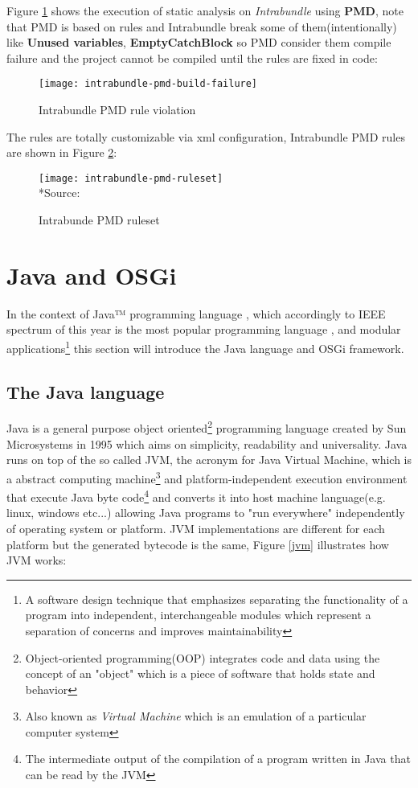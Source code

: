 \FloatBarrier

Figure \ref{pmd violation} shows the execution of static analysis on \textit{Intrabundle} using \textbf{PMD}, note that PMD is based on rules and Intrabundle break some of them(intentionally) like \textbf{Unused variables}, \textbf{EmptyCatchBlock} so PMD consider them compile failure and the project cannot be compiled until the rules are fixed in code:

\begin{figure}[h]
\label{pmd violation}
\caption{Intrabundle PMD rule violation}
\centering
\texttt{[image: intrabundle-pmd-build-failure]}
\end{figure}

\FloatBarrier

The rules are totally customizable via xml configuration, Intrabundle PMD rules are shown in Figure \ref{pmd ruleset}:

\begin{figure}[h]
\label{pmd ruleset}
\caption{Intrabunde PMD ruleset}
\centering
\texttt{[image: intrabundle-pmd-ruleset]}
\\*Source: \cite{intrabundle pmd 2014}
\end{figure}

\FloatBarrier

\section{Java and OSGi}

In the context of Java™ programming language \citep{Arnold 2005}, which accordingly to IEEE spectrum of this year is the most popular programming language \citep{ieee spectrum 2014}, and modular applications\footnote{A software design technique that emphasizes separating the functionality of a program into independent, interchangeable modules which represent a separation of concerns and improves maintainability} this section will introduce the Java language and OSGi framework.

\subsection{The Java language}
Java is a general purpose object oriented\footnote{Object-oriented programming(OOP) integrates code and data using the concept of an "object" which is a piece of software that holds state and behavior} programming language created by Sun Microsystems in 1995 which aims on simplicity, readability and universality. Java runs on top of the so called JVM, the acronym for Java Virtual Machine, which is a abstract computing machine\footnote{Also known as \textit{Virtual Machine} which is an emulation of a particular computer system} and platform-independent execution environment that execute Java byte code\footnote{The intermediate output of the compilation of a program written in Java that can be read by the JVM} and converts it into host machine language(e.g. linux, windows etc...) allowing Java programs to "run everywhere" independently of operating system or platform. JVM implementations are different for each platform but the generated bytecode is the same, Figure \ref{jvm} illustrates how JVM works:

